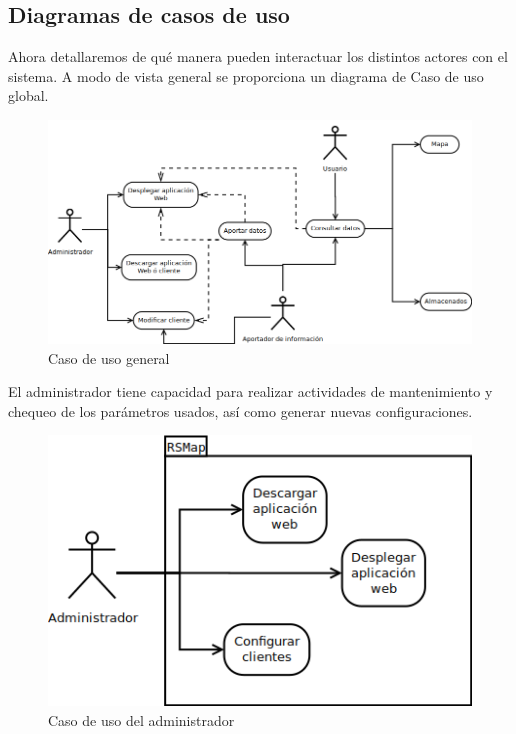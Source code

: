 \subsection{Diagramas de casos de uso}

Ahora detallaremos de qué manera pueden interactuar los distintos actores con el sistema. A modo de vista general se proporciona un diagrama de Caso de uso global.

\begin{figure}[!ht]
  \begin{center}
    \includegraphics[scale=0.45]{../images/diag_plan/cu_gen.png}
    \caption{Caso de uso general}
    \label{fig:cu_admin}
  \end{center}
\end{figure}



El administrador tiene capacidad para realizar actividades de mantenimiento y chequeo de los parámetros usados, así como generar nuevas configuraciones.
\begin{figure}[!ht]
  \begin{center}
    \includegraphics[scale=0.45]{../images/diag_plan/cu_admin.png}
    \caption{Caso de uso del administrador}
    \label{fig:cu_admin}
  \end{center}
\end{figure}

